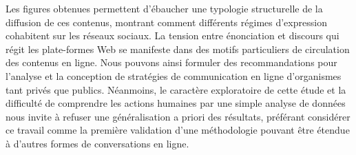 Les figures obtenues permettent d’ébaucher une typologie structurelle de la diffusion de ces contenus, montrant comment différents régimes d'expression cohabitent sur les réseaux sociaux. La tension entre énonciation et discours qui régit les plate-formes Web se manifeste dans des motifs particuliers de circulation des contenus en ligne. Nous pouvons ainsi formuler des recommandations pour l’analyse et la conception de stratégies de communication en ligne d’organismes tant privés que publics. Néanmoins, le caractère exploratoire de cette étude et la difficulté de comprendre les actions humaines par une simple analyse de données nous invite à refuser une généralisation a priori des résultats, préférant considérer ce travail comme la première validation d’une méthodologie pouvant être étendue à d’autres formes de conversations en ligne.
